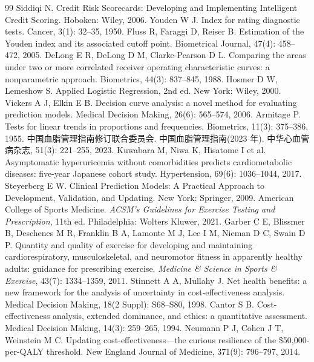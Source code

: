 \documentclass{MathorCupmodeling}
\begin{document}
\begin{thebibliography}{99}
 Siddiqi N. Credit Risk Scorecards: Developing and Implementing Intelligent Credit Scoring. Hoboken: Wiley, 2006.
 Youden W J. Index for rating diagnostic tests. Cancer, 3(1): 32--35, 1950.
 Fluss R, Faraggi D, Reiser B. Estimation of the Youden index and its associated cutoff point. Biometrical Journal, 47(4): 458--472, 2005.
 DeLong E R, DeLong D M, Clarke-Pearson D L. Comparing the areas under two or more correlated receiver operating characteristic curves: a nonparametric approach. Biometrics, 44(3): 837--845, 1988.
 Hosmer D W, Lemeshow S. Applied Logistic Regression, 2nd ed. New York: Wiley, 2000.
 Vickers A J, Elkin E B. Decision curve analysis: a novel method for evaluating prediction models. Medical Decision Making, 26(6): 565--574, 2006.
 Armitage P. Tests for linear trends in proportions and frequencies. Biometrics, 11(3): 375--386, 1955.
 中国血脂管理指南修订联合委员会. 中国血脂管理指南(2023 年). 中华心血管病杂志, 51(3): 221--255, 2023.
 Kuwabara M, Niwa K, Hisatome I et al. Asymptomatic hyperuricemia without comorbidities predicts cardiometabolic diseases: five-year Japanese cohort study. Hypertension, 69(6): 1036--1044, 2017.
 Steyerberg E W. Clinical Prediction Models: A Practical Approach to Development, Validation, and Updating. New York: Springer, 2009.
 American College of Sports Medicine. \textit{ACSM's Guidelines for Exercise Testing and Prescription}, 11th ed. Philadelphia: Wolters Kluwer, 2021.
 Garber C E, Blissmer B, Deschenes M R, Franklin B A, Lamonte M J, Lee I M, Nieman D C, Swain D P. Quantity and quality of exercise for developing and maintaining cardiorespiratory, musculoskeletal, and neuromotor fitness in apparently healthy adults: guidance for prescribing exercise. \textit{Medicine \& Science in Sports \& Exercise}, 43(7): 1334--1359, 2011.
 Stinnett A A, Mullahy J. Net health benefits: a new framework for the analysis of uncertainty in cost-effectiveness analysis. Medical Decision Making, 18(2 Suppl): S68--S80, 1998.
 Cantor S B. Cost-effectiveness analysis, extended dominance, and ethics: a quantitative assessment. Medical Decision Making, 14(3): 259--265, 1994.
 Neumann P J, Cohen J T, Weinstein M C. Updating cost-effectiveness---the curious resilience of the \$50,000-per-QALY threshold. New England Journal of Medicine, 371(9): 796--797, 2014.

\end{thebibliography}
\end{document}
